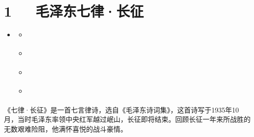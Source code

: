 \documentclass[letterpaper,12pt,english]{sphinxmanual}
\begin{document}
\chapter{1   毛泽东\sphinxhyphen{}七律·长征}
\label{\detokenize{p01_u6563_u6587/_u6bdb_u6cfd_u4e1c-_u4e03_u5f8b_xb7_u957f_u5f81:id1}}\label{\detokenize{p01_u6563_u6587/_u6bdb_u6cfd_u4e1c-_u4e03_u5f8b_xb7_u957f_u5f81::doc}}
\begin{sphinxShadowBox}
\begin{itemize}
\item {} 
\label{\detokenize{p01_u6563_u6587/_u6bdb_u6cfd_u4e1c-_u4e03_u5f8b_xb7_u957f_u5f81:id7}}{\hyperref[\detokenize{p01_u6563_u6587/_u6bdb_u6cfd_u4e1c-_u4e03_u5f8b_xb7_u957f_u5f81:id1}]{}}
\begin{itemize}
\item {} 
\label{\detokenize{p01_u6563_u6587/_u6bdb_u6cfd_u4e1c-_u4e03_u5f8b_xb7_u957f_u5f81:id8}}{\hyperref[\detokenize{p01_u6563_u6587/_u6bdb_u6cfd_u4e1c-_u4e03_u5f8b_xb7_u957f_u5f81:id3}]{}}

\item {} 
\label{\detokenize{p01_u6563_u6587/_u6bdb_u6cfd_u4e1c-_u4e03_u5f8b_xb7_u957f_u5f81:id9}}{\hyperref[\detokenize{p01_u6563_u6587/_u6bdb_u6cfd_u4e1c-_u4e03_u5f8b_xb7_u957f_u5f81:id4}]{}}

\item {} 
\label{\detokenize{p01_u6563_u6587/_u6bdb_u6cfd_u4e1c-_u4e03_u5f8b_xb7_u957f_u5f81:id10}}{\hyperref[\detokenize{p01_u6563_u6587/_u6bdb_u6cfd_u4e1c-_u4e03_u5f8b_xb7_u957f_u5f81:id5}]{}}

\item {} 
\label{\detokenize{p01_u6563_u6587/_u6bdb_u6cfd_u4e1c-_u4e03_u5f8b_xb7_u957f_u5f81:id11}}{\hyperref[\detokenize{p01_u6563_u6587/_u6bdb_u6cfd_u4e1c-_u4e03_u5f8b_xb7_u957f_u5f81:id6}]{}}

\end{itemize}

\end{itemize}
\end{sphinxShadowBox}

《七律·长征》是一首七言律诗，选自《毛泽东诗词集》，这首诗写于1935年10月，当时毛泽东率领中央红军越过岷山，长征即将结束。回顾长征一年来所战胜的无数艰难险阻，他满怀喜悦的战斗豪情。
\end{document}
